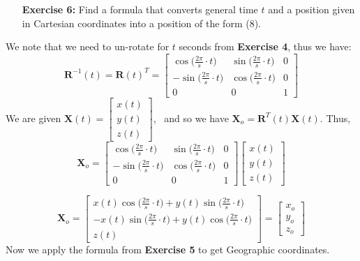 \documentclass[11pt]{article}
\theoremstyle{definition}
\newcommand{\1}[1]{\mathbf{1} \left \{ #1 \right \}}
\begin{document}
\begin{itemize}
\item[{\textbf{Exercise 6:}}] Find a formula that converts general time $t$ and a position given in Cartesian coordinates into a position of the form (8).
\end{itemize}
We note that we need to un-rotate for $t$ seconds from \textbf{Exercise 4}, thus we have:
\[\textbf{R}^{-1}(t) = \textbf{R}(t)^T = \begin{bmatrix}
\cos \big(\frac{2\pi}{s} \cdot t\big) & \sin \big(\frac{2\pi}{s} \cdot t\big) & 0 \\ -\sin \big(\frac{2\pi}{s} \cdot t\big) & \cos \big(\frac{2\pi}{s} \cdot t\big) & 0 \\ 0 & 0 & 1 \end{bmatrix}\]
We are given \(\textbf{X}(t) = \begin{bmatrix}
x(t) \\ y(t) \\ z(t) \end{bmatrix}\), \ and so we have \(\textbf{X}_o = \textbf{R}^T(t) \textbf{X}(t)\).  Thus,
\[\textbf{X}_o = \begin{bmatrix}
\cos \big(\frac{2\pi}{s} \cdot t\big) & \sin \big(\frac{2\pi}{s} \cdot t\big) & 0 \\ -\sin \big(\frac{2\pi}{s} \cdot t\big) & \cos \big(\frac{2\pi}{s} \cdot t\big) & 0 \\ 0 & 0 & 1 \end{bmatrix}
\begin{bmatrix} x(t) \\ y(t) \\ z(t) \end{bmatrix}\]

\[\textbf{X}_o = \begin{bmatrix}
x(t)\cos \big(\frac{2\pi}{s} \cdot t\big) + y(t)\sin \big(\frac{2\pi}{s} \cdot t\big) \\ -x(t)\sin \big(\frac{2\pi}{s} \cdot t\big) + y(t)\cos \big(\frac{2\pi}{s} \cdot t\big) \\ z(t)
\end{bmatrix}
= \begin{bmatrix} x_o \\ y_o \\ z_o \end{bmatrix}\]
Now we apply the formula from \textbf{Exercise 5} to get Geographic coordinates.
\end{document}
